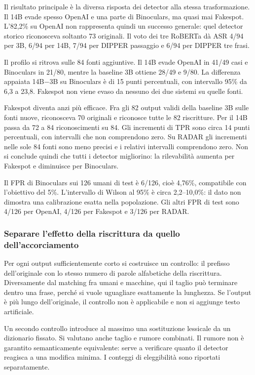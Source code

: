\documentclass[11pt,a4paper]{article}
\begin{document}
Il risultato principale è la diversa risposta dei detector alla stessa trasformazione. Il 14B evade spesso OpenAI e una parte di Binoculars, ma quasi mai Fakespot. L'82,2\% su OpenAI non rappresenta quindi un successo generale: quel detector storico riconosceva soltanto 73 originali. Il voto dei tre RoBERTa dà ASR 4/94 per 3B, 6/94 per 14B, 7/94 per DIPPER passaggio e 6/94 per DIPPER tre frasi.

Il profilo si ritrova sulle 84 fonti aggiuntive. Il 14B evade OpenAI in 41/49 casi e Binoculars in 21/80, mentre la baseline 3B ottiene 28/49 e 9/80. La differenza appaiata 14B\ensuremath{-}3B su Binoculars è di 15 punti percentuali, con intervallo 95\% da 6,3 a 23,8. Fakespot non viene evaso da nessuno dei due sistemi su quelle fonti.

Fakespot diventa anzi più efficace. Fra gli 82 output validi della baseline 3B sulle fonti nuove, riconosceva 70 originali e riconosce tutte le 82 riscritture. Per il 14B passa da 72 a 84 riconoscimenti su 84. Gli incrementi di TPR sono circa 14 punti percentuali, con intervalli che non comprendono zero. Su RADAR gli incrementi nelle sole 84 fonti sono meno precisi e i relativi intervalli comprendono zero. Non si conclude quindi che tutti i detector migliorino: la rilevabilità aumenta per Fakespot e diminuisce per Binoculars.

Il FPR di Binoculars sui 126 umani di test è 6/126, cioè 4,76\%, compatibile con l'obiettivo del 5\%. L'intervallo di Wilson al 95\% è circa 2,2--10,0\%: il dato non dimostra una calibrazione esatta nella popolazione. Gli altri FPR di test sono 4/126 per OpenAI, 4/126 per Fakespot e 3/126 per RADAR.

\subsubsection{Separare l'effetto della riscrittura da quello dell'accorciamento}\label{separare-leffetto-della-riscrittura-da-quello-dellaccorciamento}

Per ogni output sufficientemente corto si costruisce un controllo: il prefisso dell'originale con lo stesso numero di parole alfabetiche della riscrittura. Diversamente dal matching fra umani e macchine, qui il taglio può terminare dentro una frase, perché si vuole uguagliare esattamente la lunghezza. Se l'output è più lungo dell'originale, il controllo non è applicabile e non si aggiunge testo artificiale.

Un secondo controllo introduce al massimo una sostituzione lessicale da un dizionario fissato. Si valutano anche taglio e rumore combinati. Il rumore non è garantito semanticamente equivalente: serve a verificare quanto il detector reagisca a una modifica minima. I conteggi di eleggibilità sono riportati separatamente.
\end{document}
